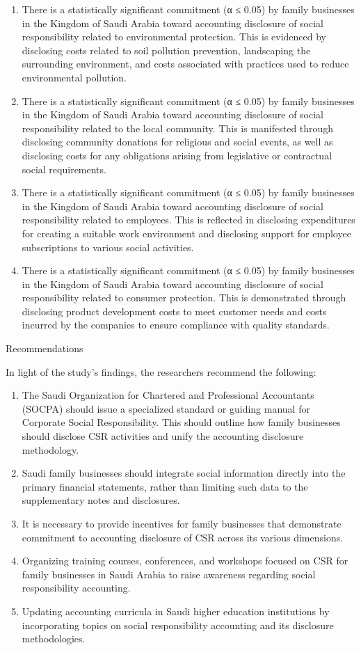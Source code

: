 \documentclass{default}
\begin{document}
\begin{enumerate}
  \item There is a statistically significant commitment (α ≤ 0.05) by family businesses in the Kingdom of Saudi Arabia toward accounting disclosure of social responsibility related to environmental protection. This is evidenced by disclosing costs related to soil pollution prevention, landscaping the surrounding environment, and costs associated with practices used to reduce environmental pollution.
  \item There is a statistically significant commitment (α ≤ 0.05) by family businesses in the Kingdom of Saudi Arabia toward accounting disclosure of social responsibility related to the local community. This is manifested through disclosing community donations for religious and social events, as well as disclosing costs for any obligations arising from legislative or contractual social requirements.
  \item There is a statistically significant commitment (α ≤ 0.05) by family businesses in the Kingdom of Saudi Arabia toward accounting disclosure of social responsibility related to employees. This is reflected in disclosing expenditures for creating a suitable work environment and disclosing support for employee subscriptions to various social activities.
  \item There is a statistically significant commitment (α ≤ 0.05) by family businesses in the Kingdom of Saudi Arabia toward accounting disclosure of social responsibility related to consumer protection. This is demonstrated through disclosing product development costs to meet customer needs and costs incurred by the companies to ensure compliance with quality standards.
\end{enumerate}

Recommendations

In light of the study’s findings, the researchers recommend the following:

\begin{enumerate}
  \item The Saudi Organization for Chartered and Professional Accountants (SOCPA) should issue a specialized standard or guiding manual for Corporate Social Responsibility. This should outline how family businesses should disclose CSR activities and unify the accounting disclosure methodology.
  \item Saudi family businesses should integrate social information directly into the primary financial statements, rather than limiting such data to the supplementary notes and disclosures.
  \item It is necessary to provide incentives for family businesses that demonstrate commitment to accounting disclosure of CSR across its various dimensions.
  \item Organizing training courses, conferences, and workshops focused on CSR for family businesses in Saudi Arabia to raise awareness regarding social responsibility accounting.
  \item Updating accounting curricula in Saudi higher education institutions by incorporating topics on social responsibility accounting and its disclosure methodologies.
\end{enumerate}
\end{document}
